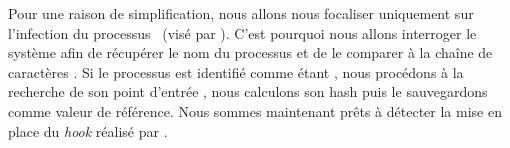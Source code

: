 Pour une raison de simplification, nous allons nous focaliser uniquement sur l'infection du processus \service\ (visé par \Duqu).
C'est pourquoi nous allons interroger le système afin de récupérer le nom du processus et de le comparer à la chaîne de caractères \service. Si le processus est identifié comme étant \service, nous procédons à la recherche de son point d'entrée%
, nous calculons son hash puis le sauvegardons comme valeur de référence. Nous sommes maintenant prêts à détecter la mise en place du \emph{hook} réalisé par \Duqu.


% 
% 
% 
% 
% 
% 
